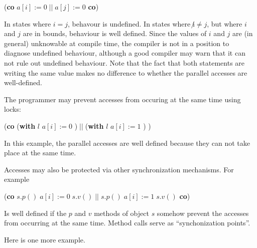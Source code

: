 \documentclass{article}%
\begin{document}
\begin{code}
(\textbf{co} $a[i]:=0\;||\;a[j]:=0$ \textbf{co})
\end{code}

\noindent In states where $i=j$, behavour is undefined. In states where
$\not i  \neq j$, but where $i$ and $j$ are in bounds, behaviour is well
defined. Since the values of $i$ and $j$ are (in general) unknowable at
compile time, the compiler is not in a position to diagnose undefined
behaviour, although a good compiler may warn that it can not rule out
undefined behaviour. Note that the fact that both statements are writing the
same value makes no difference to whether the parallel accesses are well-defined.

The programmer may prevent accesses from occuring at the same time using locks:

\begin{code}
(\textbf{co} (\textbf{with} $l$ $a[i]:=0$ )$\;||\;$(\textbf{with} $l$
$a[i]:=1$ ) )
\end{code}

\noindent In this example, the parallel accesses are well defined because they
can not take place at the same time.

Accesses may also be protected via other synchronization mechanisms. For example

\begin{code}
(\textbf{co} $s.p()\;a[i]:=0\;s.v()\;||\;s.p()\;a[i]:=1\;s.v()$ \textbf{co})
\end{code}

\noindent Is well defined if the $p$ and $v$ methods of object $s$ somehow
prevent the accesses from occurring at the same time. Method calls serve as
\textquotedblleft synchonization points\textquotedblright.

Here is one more example.
\end{document}
